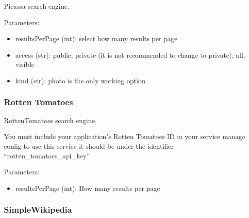 \documentclass[letterpaper,10pt,english]{sphinxmanual}
\begin{document}
\begin{fulllineitems}
\label{api2.0:puppy.search.engine.Picassa}
Picassa search engine.

Parameters:
\begin{itemize}
\item {} 
resultsPerPage (int): select how many results per page

\item {} 
access (str): public, private (it is not recommended to change to private), all, visible

\item {} 
kind (str): photo is the only working option

\end{itemize}

\end{fulllineitems}



\subsubsection{Rotten Tomatoes}
\label{api2.0:rotten-tomatoes}

\begin{fulllineitems}
\label{api2.0:puppy.search.engine.RottenTomatoes}
RottenTomatoes search engine.

You must include your application's Rotten Tomatoes ID in your service manage config to use this service
it should be under the identifier ``rotten\_tomatoes\_api\_key''

Parameters:
\begin{itemize}
\item {} 
resultsPerPage (int): How many results per page

\end{itemize}

\end{fulllineitems}



\subsubsection{SimpleWikipedia}
\label{api2.0:simplewikipedia}
\end{document}
